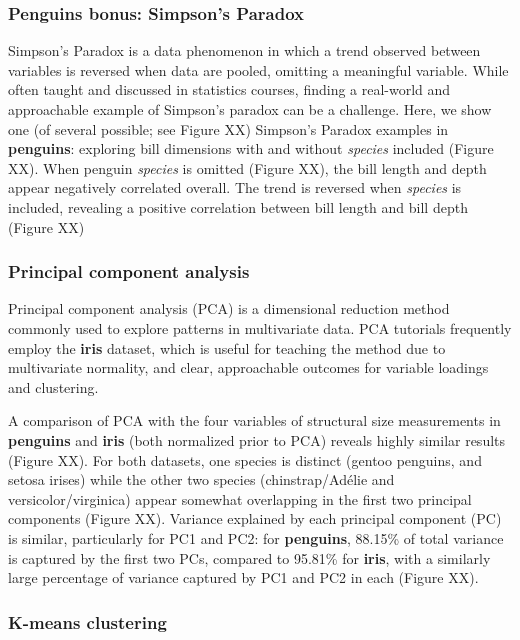 \hypertarget{penguins-bonus-simpsons-paradox}{%
\subsubsection{Penguins bonus: Simpson's
Paradox}\label{penguins-bonus-simpsons-paradox}}

Simpson's Paradox is a data phenomenon in which a trend observed between
variables is reversed when data are pooled, omitting a meaningful
variable. While often taught and discussed in statistics courses,
finding a real-world and approachable example of Simpson's paradox can
be a challenge. Here, we show one (of several possible; see Figure XX)
Simpson's Paradox examples in \textbf{penguins}: exploring bill
dimensions with and without \emph{species} included (Figure XX). When
penguin \emph{species} is omitted (Figure XX), the bill length and depth
appear negatively correlated overall. The trend is reversed when
\emph{species} is included, revealing a positive correlation between
bill length and bill depth (Figure XX)

\hypertarget{principal-component-analysis}{%
\subsubsection{Principal component
analysis}\label{principal-component-analysis}}

Principal component analysis (PCA) is a dimensional reduction method
commonly used to explore patterns in multivariate data. PCA tutorials
frequently employ the \textbf{iris} dataset, which is useful for
teaching the method due to multivariate normality, and clear,
approachable outcomes for variable loadings and clustering.

A comparison of PCA with the four variables of structural size
measurements in \textbf{penguins} and \textbf{iris} (both normalized
prior to PCA) reveals highly similar results (Figure XX). For both
datasets, one species is distinct (gentoo penguins, and setosa irises)
while the other two species (chinstrap/Adélie and versicolor/virginica)
appear somewhat overlapping in the first two principal components
(Figure XX). Variance explained by each principal component (PC) is
similar, particularly for PC1 and PC2: for \textbf{penguins}, 88.15\% of
total variance is captured by the first two PCs, compared to 95.81\% for
\textbf{iris}, with a similarly large percentage of variance captured by
PC1 and PC2 in each (Figure XX).

\hypertarget{k-means-clustering}{%
\subsubsection{K-means clustering}\label{k-means-clustering}}

